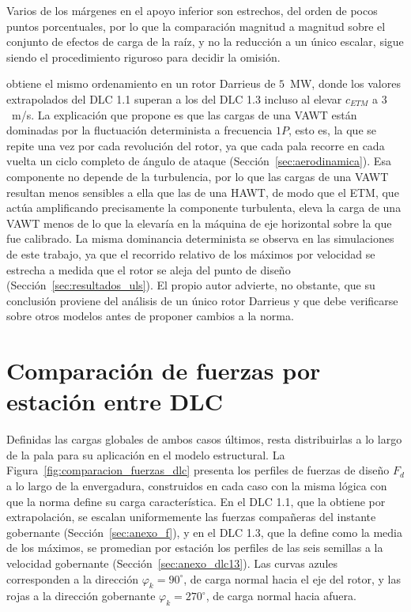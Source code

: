 Varios de los márgenes en el apoyo inferior son estrechos, del orden de pocos puntos porcentuales, por lo que la comparación magnitud a magnitud sobre el conjunto de efectos de carga de la raíz, y no la reducción a un único escalar, sigue siendo el procedimiento riguroso para decidir la omisión.

\textcite{Galinos2015} obtiene el mismo ordenamiento en un rotor Darrieus de $5$~MW, donde los valores extrapolados del DLC 1.1 superan a los del DLC 1.3 incluso al elevar $c_{ETM}$ a $3$~m/s. La explicación que propone es que las cargas de una VAWT están dominadas por la fluctuación determinista a frecuencia $1P$, esto es, la que se repite una vez por cada revolución del rotor, ya que cada pala recorre en cada vuelta un ciclo completo de ángulo de ataque (Sección~\ref{sec:aerodinamica}). Esa componente no depende de la turbulencia, por lo que las cargas de una VAWT resultan menos sensibles a ella que las de una HAWT, de modo que el ETM, que actúa amplificando precisamente la componente turbulenta, eleva la carga de una VAWT menos de lo que la elevaría en la máquina de eje horizontal sobre la que fue calibrado. La misma dominancia determinista se observa en las simulaciones de este trabajo, ya que el recorrido relativo de los máximos por velocidad se estrecha a medida que el rotor se aleja del punto de diseño (Sección~\ref{sec:resultados_uls}). El propio autor advierte, no obstante, que su conclusión proviene del análisis de un único rotor Darrieus y que debe verificarse sobre otros modelos antes de proponer cambios a la norma.

\section{Comparación de fuerzas por estación entre DLC}
\label{sec:comparacion_dlc}

Definidas las cargas globales de ambos casos últimos, resta distribuirlas a lo largo de la pala para su aplicación en el modelo estructural. La Figura~\ref{fig:comparacion_fuerzas_dlc} presenta los perfiles de fuerzas de diseño $F_d$ a lo largo de la envergadura, construidos en cada caso con la misma lógica con que la norma define su carga característica. En el DLC 1.1, que la obtiene por extrapolación, se escalan uniformemente las fuerzas compañeras del instante gobernante (Sección~\ref{sec:anexo_f}), y en el DLC 1.3, que la define como la media de los máximos, se promedian por estación los perfiles de las seis semillas a la velocidad gobernante (Sección~\ref{sec:anexo_dlc13}). Las curvas azules corresponden a la dirección $\varphi_k = 90^\circ$, de carga normal hacia el eje del rotor, y las rojas a la dirección gobernante $\varphi_k = 270^\circ$, de carga normal hacia afuera.

